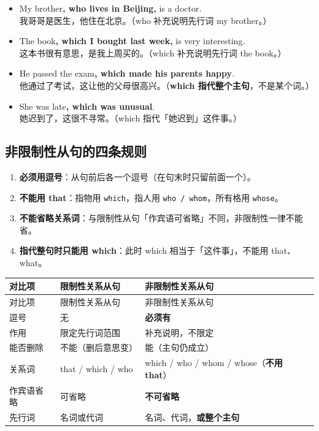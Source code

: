 \documentclass[11pt,a4paper]{ctexart}
\begin{document}
\begin{itemize}[leftmargin=1.4em]
\item My brother\textbf{, who lives in Beijing,} is a doctor.\\ 我哥哥是医生，他住在北京。（who 补充说明先行词 my brother。）
\item The book\textbf{, which I bought last week,} is very interesting.\\ 这本书很有意思，是我上周买的。（which 补充说明先行词 the book。）
\item He passed the exam\textbf{, which made his parents happy}.\\ 他通过了考试，这让他的父母很高兴。（\textbf{which 指代整个主句}，不是某个词。）
\item She was late\textbf{, which was unusual}.\\ 她迟到了，这很不寻常。（which 指代「她迟到」这件事。）
\end{itemize}

\subsection*{非限制性从句的四条规则}

\begin{enumerate}[leftmargin=1.4em]
\item \textbf{必须用逗号}：从句前后各一个逗号（在句末时只留前面一个）。
\item \textbf{不能用 that}：指物用 \texttt{which}，指人用 \texttt{who / whom}，所有格用 \texttt{whose}。
\item \textbf{不能省略关系词}：与限制性从句「作宾语可省略」不同，非限制性一律不能省。
\item \textbf{指代整句时只能用 which}：此时 which 相当于「这件事」，不能用 that、what。
\end{enumerate}

{\footnotesize
\begin{longtable}{p{4.47cm}p{4.47cm}p{4.47cm}}
\hline
对比项 & 限制性关系从句 & 非限制性关系从句 \\
\hline
\endfirsthead
\hline
对比项 & 限制性关系从句 & 非限制性关系从句 \\
\hline
\endhead
\hline
\endfoot
逗号 & 无 & \textbf{必须有} \\
作用 & 限定先行词范围 & 补充说明，不限定 \\
能否删除 & 不能（删后意思变） & 能（主句仍成立） \\
关系词 & that / which / who & which / who / whom / whose（\textbf{不用 that}） \\
作宾语省略 & 可省略 & \textbf{不可省略} \\
先行词 & 名词或代词 & 名词、代词，\textbf{或整个主句} \\
\end{longtable}
}
\end{document}

